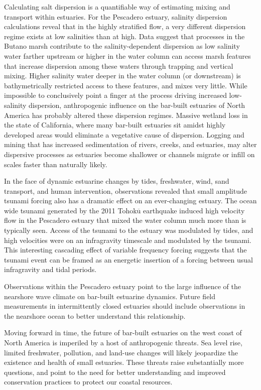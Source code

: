 Calculating salt dispersion is a quantifiable way of estimating mixing and transport within estuaries. For the Pescadero estuary, salinity dispersion calculations reveal that in the highly stratified flow, a very different dispersion regime exists at low salinities than at high. Data suggest that processes in the Butano marsh contribute to the salinity-dependent dispersion as low salinity water farther upstream or higher in the water column can access marsh features that increase dispersion among these waters through trapping and vertical mixing. Higher salinity water deeper in the water column (or downstream) is bathymetrically restricted access to these features, and mixes very little. While impossible to conclusively point a finger at the process driving increased low-salinity dispersion, anthropogenic influence on the bar-built estuaries of North America has probably altered these dispersion regimes. Massive wetland loss in the state of California, where many bar-built estuaries sit amidst highly developed areas would eliminate a vegetative cause of dispersion. Logging and mining that has increased sedimentation of rivers, creeks, and estuaries, may alter dispersive processes as estuaries become shallower or channels migrate or infill on scales faster than naturally likely.  

In the face of dynamic estuarine changes by tides, freshwater, wind, sand transport, and human intervention, observations revealed that small amplitude tsunami forcing also has a dramatic effect on an ever-changing estuary. The ocean wide tsunami generated by the 2011 Tohok$\overline{\mathrm{u}}$ earthquake induced high velocity flow in the Pescadero estuary that mixed the water column much more than is typically seen. Access of the tsunami to the estuary was modulated by tides, and high velocities were on an infragravity timescale and modulated by the tsunami. This interesting cascading effect of variable frequency forcing suggests that the tsunami event can be framed as an energetic insertion of a forcing between usual infragravity and tidal periods.

Observations within the Pescadero estuary point to the large influence of the nearshore wave climate on bar-built estuarine dynamics.  Future field measurements in intermittently closed estuaries should include observations in the nearshore ocean to better understand this relationship. 

Moving forward in time, the future of bar-built estuaries on the west coast of North America is imperiled by a host of anthropogenic threats. Sea level rise, limited freshwater, pollution, and land-use changes will likely jeopardize the existence and health of small estuaries. These threats raise substantially more questions, and point to the need for better understanding and improved conservation practices to protect our coastal resources. 
